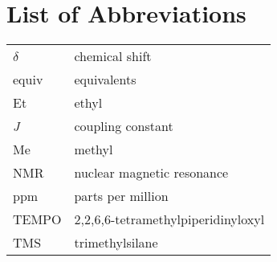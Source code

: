 







\begingroup

\let\clearpage\relax
\let\cleardoublepage\relax
\let\cleardoublepage\relax

\chapter*{List of Abbreviations}

\begin{table}[ht]
\centering
\begin{tabular}{ l l }
\toprule
$\delta$ & chemical shift \\
equiv & equivalents \\
Et & ethyl \\
\textit{J} & coupling constant \\
Me & methyl \\
NMR & nuclear magnetic resonance \\
ppm & parts per million \\
TEMPO & $2$,$2$,$6$,$6$-tetramethylpiperidinyloxyl \\
TMS & trimethylsilane \\
\bottomrule
\end{tabular}
\label{tab:SI}
\end{table}


\endgroup
